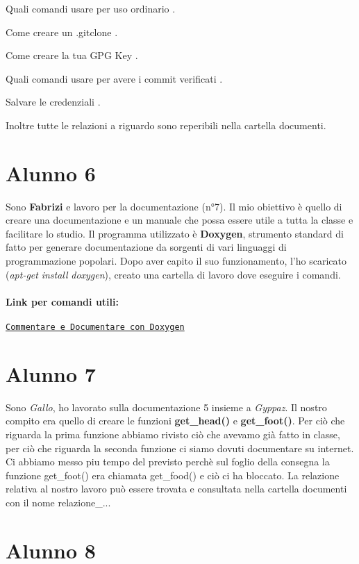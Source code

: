 Quali comandi usare per uso ordinario .

Come creare un .gitclone .

Come creare la tua G\+PG Key .

Quali comandi usare per avere i commit verificati .

Salvare le credenziali .

Inoltre tutte le relazioni a riguardo sono reperibili nella cartella documenti. \section*{Alunno 6}

Sono {\bfseries Fabrizi} e lavoro per la documentazione (n°7). Il mio obiettivo è quello di creare una documentazione e un manuale che possa essere utile a tutta la classe e facilitare lo studio. Il programma utilizzato è {\bfseries Doxygen}, strumento standard di fatto per generare documentazione da sorgenti di vari linguaggi di programmazione popolari. Dopo aver capito il suo funzionamento, l’ho scaricato ({\itshape apt-\/get} {\itshape install} {\itshape doxygen}), creato una cartella di lavoro dove eseguire i comandi.

\paragraph*{Link per comandi utili\+:}

\href{http://www.lotar.altervista.org/wiki/programming/php-and-doxygen}{\tt Commentare e Documentare con Doxygen} \section*{Alunno 7}

Sono {\itshape Gallo}, ho lavorato sulla documentazione 5 insieme a {\itshape Gyppaz}. Il nostro compito era quello di creare le funzioni {\bfseries get\+\_\+head()} e {\bfseries get\+\_\+foot()}. Per ciò che riguarda la prima funzione abbiamo rivisto ciò che avevamo già fatto in classe, per ciò che riguarda la seconda funzione ci siamo dovuti documentare su internet. Ci abbiamo messo piu\textquotesingle{} tempo del previsto perchè sul foglio della consegna la funzione get\+\_\+foot() era chiamata get\+\_\+food() e ciò ci ha bloccato. La relazione relativa al nostro lavoro può essere trovata e consultata nella cartella documenti con il nome relazione\+\_... \section*{Alunno 8}

